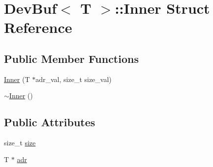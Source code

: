 \hypertarget{structDevBuf_1_1Inner}{\section{Dev\-Buf$<$ T $>$\-:\-:Inner Struct Reference}
\label{structDevBuf_1_1Inner}
}
\subsection*{Public Member Functions}
\begin{DoxyCompactItemize}
\item 
\hyperlink{structDevBuf_1_1Inner_a1ed3b03264898d0c9304530b89390a1d}{Inner} (T $\ast$adr\-\_\-val, size\-\_\-t size\-\_\-val)
\item 
\hyperlink{structDevBuf_1_1Inner_a55df759ac2dc9e82c28f623bad008d6d}{$\sim$\-Inner} ()
\end{DoxyCompactItemize}
\subsection*{Public Attributes}
\begin{DoxyCompactItemize}
\item 
size\-\_\-t \hyperlink{structDevBuf_1_1Inner_a90303814c8622e8060373e943750ebb2}{size}
\item 
T $\ast$ \hyperlink{structDevBuf_1_1Inner_ae38450c289c536e74c830ad6e958608c}{adr}
\end{DoxyCompactItemize}


